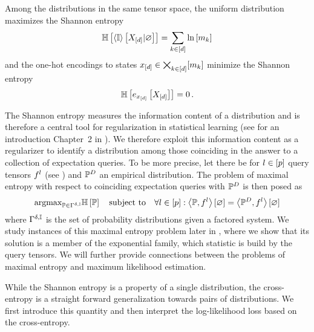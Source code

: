 Among the distributions in the same tensor space, the uniform distribution maximizes the Shannon entropy
\begin{align*}
    \mathbb{H}\left[\left\langle \mathbb{I}\right\rangle \left[ X_{[d]} | \varnothing \right]\right] = \sum_{k\in[d]}\ln \left[ m_{k} \right]
\end{align*}
and the one-hot encodings to states $x_{[d]}\in\bigtimes_{k\in[d]}[m_{k}]$ minimize the Shannon entropy
\begin{align*}
    \mathbb{H}\left[e_{x_{[d]}}\left[X_{[d]}\right]\right] = 0 \, .
\end{align*}

The Shannon entropy measures the information content of a distribution and is therefore a central tool for regularization in statistical learning (see for an introduction Chapter~2 in \cite{mackay_information_2003}).
We therefore exploit this information content as a regularizer to identify a distribution among those coinciding in the answer to a collection of expectation queries.
To be more precise, let there be for $l\in[p]$ query tensors $f^{l}$ (see ) and $\mathbb{P}^{D}$ an empirical distribution.
The problem of maximal entropy with respect to coinciding expectation queries with $\mathbb{P}^{D}$ is then posed as
\begin{align*}
    \mathrm{argmax}_{\mathbb{P}\in\Gamma^{\delta,\mathbb{I}}} \mathbb{H}\left[\mathbb{P}\right] \quad \text{subject to} \quad \forall{l\in[p]}:{\left\langle \mathbb{P},f^{l}\right\rangle \left[ \varnothing \right] = \left\langle \mathbb{P}^{D},f^{l}\right\rangle \left[ \varnothing \right]}
\end{align*}
where $\Gamma^{\delta,\mathbb{I}}$ is the set of probability distributions given a factored system.
We study instances of this maximal entropy problem later in , where we show that its solution is a member of the exponential family, which statistic is build by the query tensors.
We will further provide connections between the problems of maximal entropy and maximum likelihood estimation.

While the Shannon entropy is a property of a single distribution, the cross-entropy is a straight forward generalization towards pairs of distributions.
We first introduce this quantity and then interpret the log-likelihood loss based on the cross-entropy.

